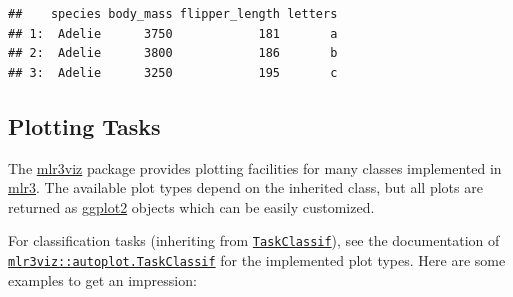 \documentclass[
]{scrbook}
\newenvironment{Shaded}{\begin{snugshade}}{\end{snugshade}}
\newcommand{\AttributeTok}[1]{\textcolor[rgb]{0.77,0.63,0.00}{#1}}
\newcommand{\CommentTok}[1]{\textcolor[rgb]{0.56,0.35,0.01}{\textit{#1}}}
\newcommand{\DecValTok}[1]{\textcolor[rgb]{0.00,0.00,0.81}{#1}}
\newcommand{\FunctionTok}[1]{\textcolor[rgb]{0.00,0.00,0.00}{#1}}
\newcommand{\NormalTok}[1]{#1}
\newcommand{\OtherTok}[1]{\textcolor[rgb]{0.56,0.35,0.01}{#1}}
\newcommand{\SpecialCharTok}[1]{\textcolor[rgb]{0.00,0.00,0.00}{#1}}
\newcommand{\StringTok}[1]{\textcolor[rgb]{0.31,0.60,0.02}{#1}}
\renewenvironment{Shaded} {\begin{snugshade}\small} {\end{snugshade}}
\begin{document}
\begin{Shaded}
\end{Shaded}

\begin{verbatim}
##    species body_mass flipper_length letters
## 1:  Adelie      3750            181       a
## 2:  Adelie      3800            186       b
## 3:  Adelie      3250            195       c
\end{verbatim}

\hypertarget{autoplot-task}{%
\subsection{Plotting Tasks}\label{autoplot-task}}

The \href{https://mlr3viz.mlr-org.com}{mlr3viz} package provides plotting facilities for many classes implemented in \href{https://mlr3.mlr-org.com}{mlr3}.
The available plot types depend on the inherited class, but all plots are returned as \href{https://cran.r-project.org/package=ggplot2}{ggplot2} objects which can be easily customized.

For classification tasks (inheriting from \href{https://mlr3.mlr-org.com/reference/TaskClassif.html}{\texttt{TaskClassif}}), see the documentation of \href{https://mlr3viz.mlr-org.com/reference/autoplot.TaskClassif.html}{\texttt{mlr3viz::autoplot.TaskClassif}} for the implemented plot types.
Here are some examples to get an impression:

\begin{Shaded}
\end{Shaded}
\end{document}
